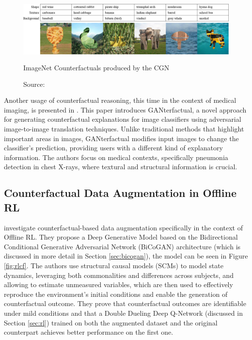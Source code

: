 \begin{figure}[ht]
    \centering
    \includegraphics[width=\textwidth]{figures/ch2/1.ctf.png}
    \caption{ImageNet Counterfactuals produced by the CGN}
    \vspace{-10px}
    \caption*{\scriptsize{Source: \cite{sauer2021}}}
    \label{fig:ctf}
\end{figure}

Another usage of counterfactual reasoning,
this time in the context of medical imaging,
is presented in \cite{mertes2022}.
This paper introduces GANterfactual,
a novel approach for generating counterfactual
explanations for image classifiers using adversarial
image-to-image translation techniques.
Unlike traditional methods that highlight
important areas in images, GANterfactual
modifies input images to change the
classifier's prediction,
providing users with a different kind
of explanatory information.
The authors focus on medical contexts,
specifically pneumonia detection in chest X-rays,
where textural and structural information is crucial.

\subsection{Counterfactual Data Augmentation in Offline RL}

\cite{lu2020} investigate counterfactual-based
data augmentation
specifically in the context of Offline RL.
They propose a Deep Generative Model based on the
Bidirectional Conditional Generative Adversarial Network
(BiCoGAN) architecture (which is discussed in more detail
in Section \ref{sec:bicogan}), the model
can be seen in Figure \ref{fig:rlcf}.
The authors use structural causal models (SCMs)
to model state dynamics, leveraging both
commonalities and differences across subjects,
and allowing to estimate unmeasured variables,
which are then used to effectively
reproduce the environment’s initial conditions
and enable the
generation of counterfactual outcome.
They prove that counterfactual outcomes are identifiable
under mild conditions and that a Double Dueling
Deep Q-Network (discussed in Section \ref{sec:rl})
trained on both the augmented dataset and the original
counterpart achieves better performance on the first one.

